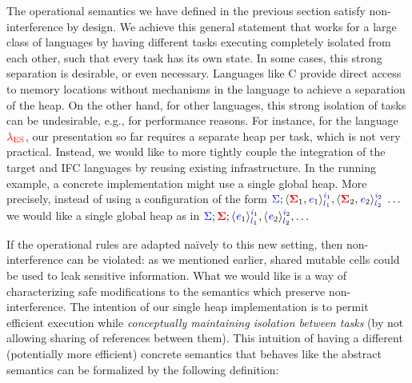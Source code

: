 \documentclass{llncs}
\newcommand{\Varid}[1]{\mathit{#1}}
\newcommand{\Red}[1]{{\color{red} #1}}
\begin{document}
The operational semantics we have defined in the previous section
satisfy non-interference by design.
We achieve this general statement that works for a large class of
languages by having different tasks executing completely isolated from
each other, such that every task has its own state.
In some cases, this strong separation is desirable, or even necessary.
Languages like C provide direct access to memory locations without
mechanisms in the language to achieve a separation of the heap.
On the other hand, for other languages, this
strong isolation of tasks can be
undesirable, e.g., for performance reasons.
For instance, for the language \ensuremath{\Red{\lambda_{\text{ES}}}}, our presentation so far
requires a separate heap per task, which is not very practical.
Instead, we would like to
more tightly couple the integration of the target and IFC
languages by reusing existing infrastructure.  In the running example,
a concrete implementation might use a single global heap.
More precisely, instead of using a configuration of the form
$\ensuremath{\ifc{\Sigma};\langle \tar{\Sigma}_{1}, \ifc{\Varid{e}}_{1}\rangle^{\ifc{\Varid{i}}_{1}}_{\ifc{l}_{1}},\langle \tar{\Sigma}_{2}, \ifc{\Varid{e}}_{2}\rangle^{\ifc{\Varid{i}}_{2}}_{\ifc{l}_{2}}\;\ldots}$
we would like a single global heap as in
$\ensuremath{\ifc{\Sigma};\tar{\Sigma};\langle \ifc{\Varid{e}}_{1}\rangle^{\ifc{\Varid{i}}_{1}}_{\ifc{l}_{1}},\langle \ifc{\Varid{e}}_{2}\rangle^{\ifc{\Varid{i}}_{2}}_{\ifc{l}_{2}},\ldots}$

If the operational rules are adapted na\"ively to this new setting,
then non-interference can be violated: as we mentioned earlier,
shared mutable cells could be used to leak sensitive information.
What we would like is a way of characterizing safe modifications to
the semantics which preserve non-interference.
The intention of our single heap implementation is to permit
efficient execution while \emph{conceptually maintaining isolation between
tasks} (by not allowing sharing of references between them).
This intuition of having a different (potentially more efficient)
concrete semantics that behaves like the abstract semantics
can be formalized by the following definition:
\end{document}
